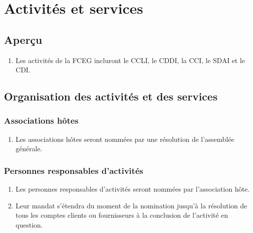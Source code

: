 \section{Activités et services}
\label{activites-et-services}

\subsection{Aperçu}
\label{activites-et-services-apercu}

\begin{enumerate}
 \item Les activités de la FCEG incluront le CCLI, le CDDI, la CCI, le SDAI et le CDI.
\end{enumerate}

\subsection{Organisation des activités et des services}
\label{activites-et-services-organisation-des-activites-et-des-services}

\subsubsection{Associations hôtes}
\label{organisation-des-activites-et-des-services-associations-hotes}

\begin{enumerate}
 \item Les associations hôtes seront nommées par une résolution de l'assemblée générale.
\end{enumerate}

\subsubsection{Personnes responsables d'activités}
\label{organisation-des-activites-et-des-services-personnes-responsables-d-activites}

\begin{enumerate}
 \item Les personnes responsables d'activités seront nommées par l'association hôte.
 \item Leur mandat s'étendra du moment de la nomination jusqu'à la résolution de tous les comptes clients ou fournisseurs à la conclusion de l'activité en question.
\end{enumerate}

